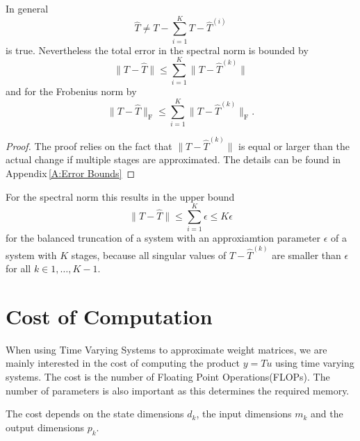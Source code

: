 \documentclass[doctype=mastersthesis,BCOR=15mm,biblatex]{ldvbook}%
\begin{document}
In general 
\begin{equation}
	\hat{T} \neq T - \sum_{i=1}^K T-\hat{T}^{(i)}
\end{equation}
is true.
Nevertheless the total error in the spectral norm is bounded by 
\begin{equation}\label{eq:error_spectral}
	\|T-\hat{T}\| \leq \sum_{i=1}^K \|T-\hat{T}^{(k)}\|
\end{equation}
and for the Frobenius norm by
\begin{equation}\label{eq:error_frobenius}
\|T-\hat{T}\|_\text{F} \leq \sum_{i=1}^K \|T-\hat{T}^{(k)}\|_\text{F}
.
\end{equation}
\begin{proof}
	The proof relies on the fact that $\|T-\hat{T}^{(k)}\|$ is equal or larger than the actual change if multiple stages are approximated.
	The details can be found in Appendix\,\ref{A:Error Bounds}
\end{proof}


For the spectral norm this results in the upper bound 
\begin{equation}\label{eq:bound_spectral_K}
	\|T-\hat{T}\| \leq \sum_{i=1}^K \epsilon \leq K\epsilon
\end{equation}
for the balanced truncation of a system with an approxiamtion parameter $\epsilon$ of a system with $K$ stages,
because all singular values of $T-\hat{T}^{(k)}$ are smaller than $\epsilon$ for all $k \in {1,\dots,K-1}$.



\section{Cost of Computation} \label{sec:cost}
When using Time Varying Systems to approximate weight matrices, we are mainly interested in the cost of computing the product $y = Tu$ using time varying systems.
The cost is the number of Floating Point Operations(FLOPs).
The number of parameters is also important as this determines the required memory.

The cost depends on the state dimensions $d_k$, the input dimensions $m_k$ and the output dimensions $p_k$.
\end{document}
